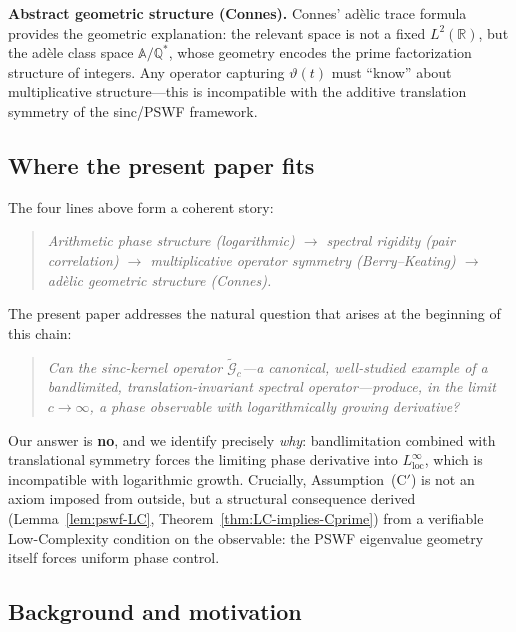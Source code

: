 \documentclass[12pt,a4paper]{amsart}
\theoremstyle{definition}
\newcommand{\tGc}{\widetilde{\mathcal{G}}_c}
\begin{document}
\textbf{Abstract geometric structure (Connes).}
Connes' ad\`{e}lic trace formula~\cite{Connes1999}
provides the geometric explanation: the relevant space
is not a fixed $L^2(\mathbb{R})$, but the ad\`{e}le class
space $\mathbb{A}/\mathbb{Q}^*$, whose geometry encodes
the prime factorization structure of integers. Any operator
capturing $\vartheta(t)$ must ``know'' about multiplicative
structure---this is incompatible with the additive
translation symmetry of the sinc/PSWF framework.

\subsection*{Where the present paper fits}

The four lines above form a coherent story:
\begin{quote}
\emph{Arithmetic phase structure (logarithmic)
$\longrightarrow$
spectral rigidity (pair correlation)
$\longrightarrow$
multiplicative operator symmetry (Berry--Keating)
$\longrightarrow$
ad\`{e}lic geometric structure (Connes).}
\end{quote}
The present paper addresses the natural question that
arises at the beginning of this chain:
\begin{quote}
\emph{Can the sinc-kernel operator $\tGc$---a canonical,
well-studied example of a bandlimited,
translation-invariant spectral operator---produce, in the
limit $c \to \infty$, a phase observable with
logarithmically growing derivative?}
\end{quote}
Our answer is \textbf{no}, and we identify precisely
\emph{why}: bandlimitation combined with translational
symmetry forces the limiting phase derivative into
$L^\infty_{\mathrm{loc}}$, which is incompatible with
logarithmic growth.
Crucially, Assumption~(C$'$) is not an axiom imposed from
outside, but a structural consequence derived
(Lemma~\ref{lem:pswf-LC}, Theorem~\ref{thm:LC-implies-Cprime})
from a verifiable Low-Complexity condition on the observable:
the PSWF eigenvalue geometry itself forces uniform phase control.

\subsection*{Background and motivation}
\end{document}
